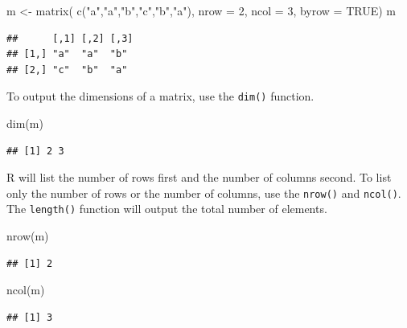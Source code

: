 \documentclass[
]{book}
\newenvironment{Shaded}{\begin{snugshade}}{\end{snugshade}}
\newcommand{\AttributeTok}[1]{\textcolor[rgb]{0.77,0.63,0.00}{#1}}
\newcommand{\ConstantTok}[1]{\textcolor[rgb]{0.00,0.00,0.00}{#1}}
\newcommand{\DecValTok}[1]{\textcolor[rgb]{0.00,0.00,0.81}{#1}}
\newcommand{\FunctionTok}[1]{\textcolor[rgb]{0.00,0.00,0.00}{#1}}
\newcommand{\NormalTok}[1]{#1}
\newcommand{\OtherTok}[1]{\textcolor[rgb]{0.56,0.35,0.01}{#1}}
\newcommand{\StringTok}[1]{\textcolor[rgb]{0.31,0.60,0.02}{#1}}
\begin{document}
\begin{Shaded}
\begin{Highlighting}[]
\NormalTok{m }\OtherTok{\textless{}{-}} \FunctionTok{matrix}\NormalTok{( }\FunctionTok{c}\NormalTok{(}\StringTok{"a"}\NormalTok{,}\StringTok{"a"}\NormalTok{,}\StringTok{"b"}\NormalTok{,}\StringTok{"c"}\NormalTok{,}\StringTok{"b"}\NormalTok{,}\StringTok{"a"}\NormalTok{), }\AttributeTok{nrow =} \DecValTok{2}\NormalTok{, }\AttributeTok{ncol =} \DecValTok{3}\NormalTok{, }\AttributeTok{byrow =} \ConstantTok{TRUE}\NormalTok{)}
\NormalTok{m}
\end{Highlighting}
\end{Shaded}

\begin{verbatim}
##      [,1] [,2] [,3]
## [1,] "a"  "a"  "b" 
## [2,] "c"  "b"  "a"
\end{verbatim}

To output the dimensions of a matrix, use the \texttt{dim()} function.

\begin{Shaded}
\begin{Highlighting}[]
\FunctionTok{dim}\NormalTok{(m) }
\end{Highlighting}
\end{Shaded}

\begin{verbatim}
## [1] 2 3
\end{verbatim}

R will list the number of rows first and the number of columns second. To list only the number of rows or the number of columns, use the \texttt{nrow()} and \texttt{ncol()}. The \texttt{length()} function will output the total number of elements.

\begin{Shaded}
\begin{Highlighting}[]
\FunctionTok{nrow}\NormalTok{(m)}
\end{Highlighting}
\end{Shaded}

\begin{verbatim}
## [1] 2
\end{verbatim}

\begin{Shaded}
\begin{Highlighting}[]
\FunctionTok{ncol}\NormalTok{(m)}
\end{Highlighting}
\end{Shaded}

\begin{verbatim}
## [1] 3
\end{verbatim}
\end{document}

